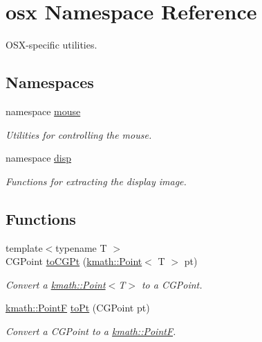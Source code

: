 \hypertarget{namespaceosx}{\section{osx Namespace Reference}
\label{namespaceosx}
}


O\-S\-X-\/specific utilities.  


\subsection*{Namespaces}
\begin{DoxyCompactItemize}
\item 
namespace \hyperlink{namespaceosx_1_1mouse}{mouse}
\begin{DoxyCompactList}\small\item\em Utilities for controlling the mouse. \end{DoxyCompactList}\item 
namespace \hyperlink{namespaceosx_1_1disp}{disp}
\begin{DoxyCompactList}\small\item\em Functions for extracting the display image. \end{DoxyCompactList}\end{DoxyCompactItemize}
\subsection*{Functions}
\begin{DoxyCompactItemize}
\item 
{\footnotesize template$<$typename T $>$ }\\C\-G\-Point \hyperlink{namespaceosx_abf7318d332d5e87088a270877f3da1ee}{to\-C\-G\-Pt} (\hyperlink{structkmath_1_1_point}{kmath\-::\-Point}$<$ T $>$ pt)
\begin{DoxyCompactList}\small\item\em Convert a {\ttfamily \hyperlink{structkmath_1_1_point}{kmath\-::\-Point}$<$T$>$} to a {\ttfamily C\-G\-Point}. \end{DoxyCompactList}\item 
\hyperlink{namespacekmath_ad80aa80b21a1aeadbd484a0fc56f4e95}{kmath\-::\-Point\-F} \hyperlink{namespaceosx_a37f829bcbe1e218b01dafeb711bd9d42}{to\-Pt} (C\-G\-Point pt)
\begin{DoxyCompactList}\small\item\em Convert a {\ttfamily C\-G\-Point} to a {\ttfamily \hyperlink{namespacekmath_ad80aa80b21a1aeadbd484a0fc56f4e95}{kmath\-::\-Point\-F}}. \end{DoxyCompactList}\end{DoxyCompactItemize}



